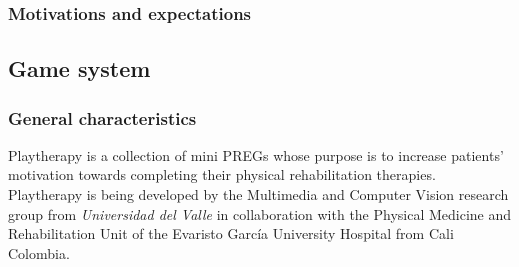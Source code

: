 \subsubsection{Motivations and expectations}










\subsection{Game system}

\subsubsection{General characteristics}
Playtherapy is a collection of mini \acp{PREG} whose purpose is to increase patients' motivation towards completing their physical rehabilitation therapies. Playtherapy is being developed by the Multimedia and Computer Vision research group from \textit{Universidad del Valle} in collaboration with the Physical Medicine and Rehabilitation Unit of the Evaristo Garc\'ia University Hospital from Cali Colombia.  

